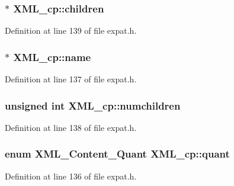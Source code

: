 \subsubsection[{\texorpdfstring{children}{children}}]{ $\ast$ X\+M\+L\+\_\+cp\+::children}\hypertarget{struct_x_m_l__cp_a06174d0e74f44cd8615ff9f4f6063481}{}\label{struct_x_m_l__cp_a06174d0e74f44cd8615ff9f4f6063481}


Definition at line 139 of file expat.\+h.

\subsubsection[{\texorpdfstring{name}{name}}]{ $\ast$ X\+M\+L\+\_\+cp\+::name}\hypertarget{struct_x_m_l__cp_a248e745fb63bf4e13d475042d8170e3b}{}\label{struct_x_m_l__cp_a248e745fb63bf4e13d475042d8170e3b}


Definition at line 137 of file expat.\+h.

\subsubsection[{\texorpdfstring{numchildren}{numchildren}}]{\setlength{\rightskip}{0pt plus 5cm}unsigned {\bf int} X\+M\+L\+\_\+cp\+::numchildren}\hypertarget{struct_x_m_l__cp_a5395f658297ee88a3ab45dfdbe389ef1}{}\label{struct_x_m_l__cp_a5395f658297ee88a3ab45dfdbe389ef1}


Definition at line 138 of file expat.\+h.

\subsubsection[{\texorpdfstring{quant}{quant}}]{\setlength{\rightskip}{0pt plus 5cm}enum {\bf X\+M\+L\+\_\+\+Content\+\_\+\+Quant} X\+M\+L\+\_\+cp\+::quant}\hypertarget{struct_x_m_l__cp_a85e6c8f3118df403b0d15491c93ae9e7}{}\label{struct_x_m_l__cp_a85e6c8f3118df403b0d15491c93ae9e7}


Definition at line 136 of file expat.\+h.

